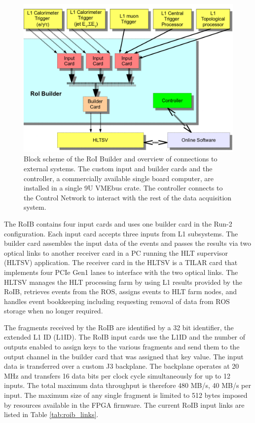 \begin{figure}[tbp] %
\centering
\includegraphics[width=.65\textwidth]{RoIB_context_v2.png}
\caption{Block scheme of the RoI Builder and overview of connections to external systems.  The
custom input and builder cards and the controller, a commercially available single board computer,
are installed in a single 9U VMEbus crate. The controller connects to the Control Network to interact with the rest of the 
data acquisition system.}
\label{roib_run1}
\end{figure}

The RoIB contains four input cards and uses one builder card in the Run-2 configuration. Each input card accepts three inputs from 
L1 subsystems. 
The builder card assembles the input data of the events and passes the results via two optical links 
to another receiver card in a PC running the HLT supervisor (HLTSV) application. The receiver card in the HLTSV is a TILAR card \cite{tilar}
 that implements four PCIe Gen1 lanes to interface with the two optical links. The HLTSV manages the HLT processing farm by using L1 results provided by the RoIB, retrieves events from the ROS, assigns events to HLT farm nodes, and handles event bookkeeping including requesting removal of data from ROS storage when no longer required. 

The fragments received by the RoIB are identified by a 32 bit identifier, the extended L1 ID (L1ID). 
The RoIB input cards use the L1ID and the number of outputs enabled to assign keys to the various fragments and send them to the output channel in the builder card that was 
assigned that key value. The input data is transferred over a custom J3 backplane. The backplane operates at 20 MHz and transfers 16 data bits per 
clock cycle simultaneously for up to 12 inputs. The total maximum data throughput is therefore 480 MB/s, 40 MB/s per input.  
The maximum size of any single fragment is limited to 512 bytes imposed by resources available in the FPGA firmware. The current RoIB input 
links are listed in Table \ref{tab:roib_links}.

